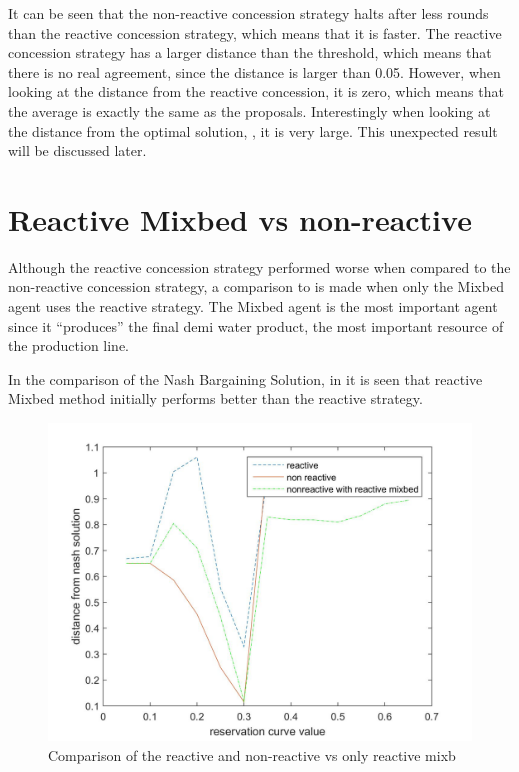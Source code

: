 It can be seen that the non-reactive concession strategy halts after less rounds than the reactive concession strategy, which means that it is faster. The reactive concession strategy has a larger distance than the threshold, which means that there is no real agreement, since the distance is larger than 0.05. However, when looking at the distance from the reactive concession, it is zero, which means that the average is exactly the same as the proposals. Interestingly when looking at the distance from the optimal solution, , it is very large. This unexpected result will be discussed later. 
\clearpage
\section{Reactive Mixbed vs non-reactive }
Although the reactive concession strategy performed worse when compared to the non-reactive concession strategy, a comparison to is made when only the Mixbed agent uses the reactive strategy. The Mixbed agent is the most important agent since it ``produces'' the final demi water product, the most important resource of the production line.

In the comparison of the Nash Bargaining Solution, in  it is seen that reactive Mixbed  method initially performs better than the reactive strategy. 


\begin{figure}[h]
	\centering
	\includegraphics[width=0.9\linewidth]{img/reactivevsnonreactivevsMixbedrea}
	\caption{Comparison of the reactive and non-reactive vs only reactive mixb}
	\label{fig:reactivevsnon-reactivevsnon-reactivemxbrea}
\end{figure}

